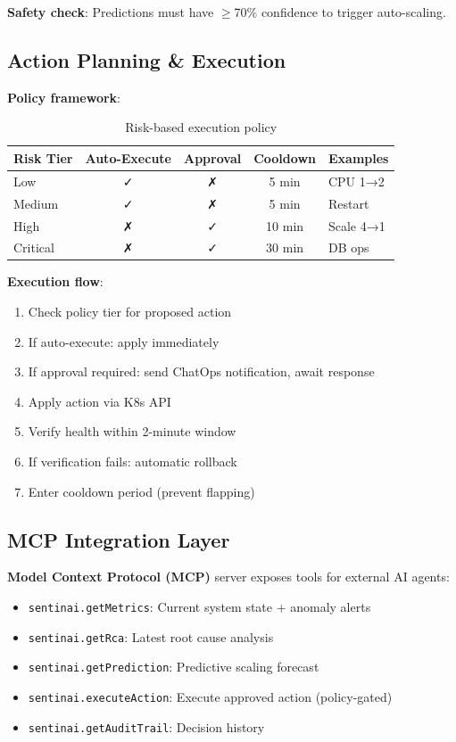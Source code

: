 \documentclass[11pt,a4paper]{article}
\begin{document}
\textbf{Safety check}: Predictions must have $\geq$70\% confidence to trigger auto-scaling.

\subsection{Action Planning \& Execution}

\textbf{Policy framework}:

\begin{table}[h]
\centering
\begin{tabular}{@{}lcccp{3cm}@{}}
\toprule
\textbf{Risk Tier} & \textbf{Auto-Execute} & \textbf{Approval} & \textbf{Cooldown} & \textbf{Examples} \\ \midrule
Low       & ✓ & ✗ & 5 min  & CPU 1→2 \\
Medium    & ✓ & ✗ & 5 min  & Restart \\
High      & ✗ & ✓ & 10 min & Scale 4→1 \\
Critical  & ✗ & ✓ & 30 min & DB ops \\ \bottomrule
\end{tabular}
\caption{Risk-based execution policy}
\end{table}

\textbf{Execution flow}:
\begin{enumerate}
    \item Check policy tier for proposed action
    \item If auto-execute: apply immediately
    \item If approval required: send ChatOps notification, await response
    \item Apply action via K8s API
    \item Verify health within 2-minute window
    \item If verification fails: automatic rollback
    \item Enter cooldown period (prevent flapping)
\end{enumerate}

\subsection{MCP Integration Layer}

\textbf{Model Context Protocol (MCP)} server exposes tools for external AI agents:

\begin{itemize}
    \item \texttt{sentinai.getMetrics}: Current system state + anomaly alerts
    \item \texttt{sentinai.getRca}: Latest root cause analysis
    \item \texttt{sentinai.getPrediction}: Predictive scaling forecast
    \item \texttt{sentinai.executeAction}: Execute approved action (policy-gated)
    \item \texttt{sentinai.getAuditTrail}: Decision history
\end{itemize}
\end{document}
